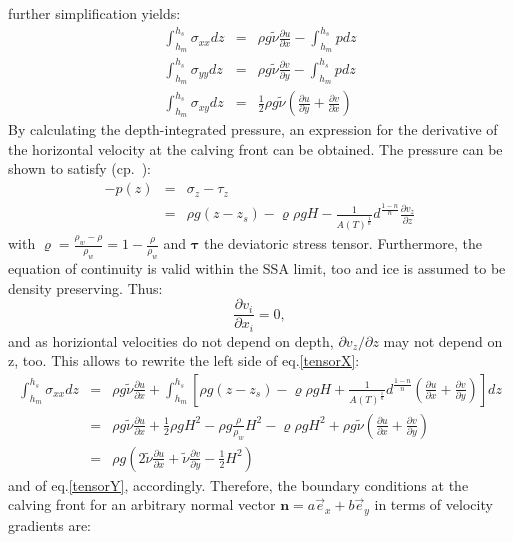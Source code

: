 \documentclass[a4paper,10pt]{article}
\begin{document}
further simplification yields:
\begin{eqnarray}%
\int_{h_m}^{h_s}\sigma_{xx}dz & = &
\rho g\tilde{\nu} \frac{\partial u}{\partial x} - \int_{h_m}^{h_s}p dz \label{tensorX}\\
\int_{h_m}^{h_s}\sigma_{yy}dz & = &
\rho g\tilde{\nu} \frac{\partial v}{\partial y} - \int_{h_m}^{h_s}p dz \label{tensorY}\\
\int_{h_m}^{h_s}\sigma_{xy}dz & = &
\frac{1}{2} \rho g\tilde{\nu} \left(\frac{\partial u}{\partial y}+\frac{\partial v}{\partial x} \right) \label{tensorXY}
\end{eqnarray}
By calculating the depth-integrated pressure, an expression for the derivative of the horizontal velocity at the calving front can be obtained. The pressure can be shown to satisfy (cp.~\cite{Weis01}):
\begin{eqnarray*}
-p(z) & = & \sigma_z - \tau_z \\
      & = & \rho g(z-z_s) - \varrho\rho gH-\frac{1}{A(T)^\frac{1}{n}}d^\frac{1-n}{n}\frac{\partial v_z}{\partial z}
\end{eqnarray*}
with $\varrho=\frac{\rho_{w}-\rho}{\rho_{w}}=1-\frac{\rho}{\rho_w}$ and $\mathbf{\tau}$ the deviatoric stress tensor.  Furthermore, the equation of continuity is valid within the SSA limit, too and ice is assumed to be density preserving. Thus:
\begin{equation*}
\frac{\partial v_i}{\partial x_i} = 0,
\end{equation*}
and as horiziontal velocities do not depend on depth, $\partial v_z/ \partial
z$ may not depend on z, too. This allows to rewrite the left side of eq.\eqref{tensorX}:
\begin{eqnarray*}
\int_{h_m}^{h_s}\sigma_{xx}dz & = & \rho g\tilde{\nu} \frac{\partial u}{\partial x} + \int_{h_m}^{h_s} \left[ \rho g(z-z_s) - \varrho\rho gH+\frac{1}{A(T)^\frac{1}{n}}d^\frac{1-n}{n} \left( \frac{\partial u}{\partial x}+\frac{\partial v}{\partial y} \right) \right] dz \\
& = & \rho g\tilde{\nu} \frac{\partial u}{\partial x} +  \frac{1}{2}\rho gH^2 - \rho g \frac{\rho}{\rho_w}H^2 -\varrho\rho gH^2+\rho g \tilde{\nu}\left( \frac{\partial u}{\partial x} + \frac{\partial v}{\partial y} \right) \\
& = & \rho g \left(2\tilde{\nu}\frac{\partial u}{\partial x} + \tilde{\nu}\frac{\partial v}{\partial y} - \frac{1}{2}H^2   \right) 
\end{eqnarray*}
and of eq.\eqref{tensorY}, accordingly. Therefore, the boundary conditions at the calving front for an arbitrary normal vector $\mathbf{n}=a\overrightarrow{e}_x+b\overrightarrow{e}_y$ in terms of velocity gradients are: 
\end{document}
